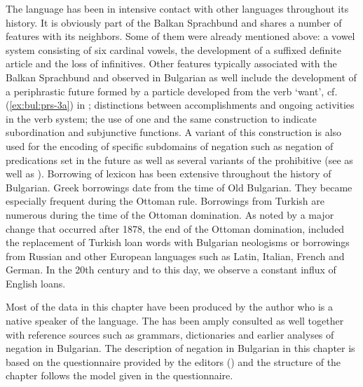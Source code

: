 \documentclass[output=paper,colorlinks=true, citecolor=brown]{langscibook}
\begin{document}
The language has been in intensive contact with other languages throughout its history. It is obviously part of the Balkan Sprachbund and shares a number of features with its neighbors. Some of them were already mentioned above: a vowel system consisting of six cardinal vowels, the development of a suffixed definite article and the loss of infinitives. Other features typically associated with the Balkan Sprachbund and observed in Bulgarian as well include the development of a periphrastic future formed by a particle developed from the verb `want', cf. (\ref{ex:bul:prs-3a}) in ; distinctions between accomplishments and ongoing activities in the verb system; the use of one and the same construction to indicate subordination and subjunctive functions. A variant of this construction is also used for the encoding of specific subdomains of negation such as negation of predications set in the future as well as several variants of the prohibitive (see  as well as ).
Borrowing of lexicon has been extensive throughout the history of Bulgarian. Greek borrowings date from the time of Old Bulgarian. They became especially frequent during the Ottoman rule. Borrowings from Turkish are numerous during the time of the Ottoman domination. As noted by \citet[240]{Scatton1993} a major change that occurred after 1878, the end of the Ottoman domination, included the replacement of Turkish loan words with Bulgarian neologisms or borrowings from Russian and other European languages such as Latin, Italian, French and German. In the 20th century and to this day, we observe a constant influx of English loans.

Most of the data in this chapter have been produced by the author who is a native speaker of the language. The \citet{BNC2023} has been amply consulted as well together with reference sources such as grammars, dictionaries and earlier analyses of negation in Bulgarian. The description of negation in Bulgarian in this chapter is based on the questionnaire provided by the editors () and the structure of the chapter follows the model given in the questionnaire.

\end{document}

